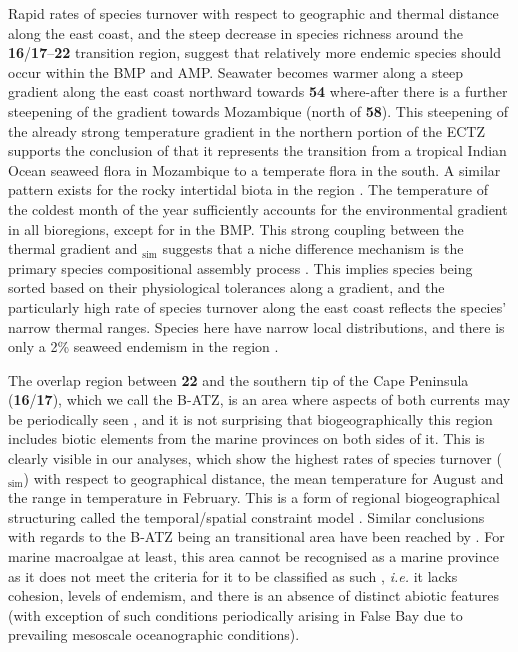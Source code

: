 \documentclass[utf8]{frontiersSCNS} %
\begin{document}
Rapid rates of species turnover with respect to geographic and thermal distance along the east coast, and the steep decrease in species richness around the \textbf{16}/\textbf{17}--\textbf{22} transition region, suggest that relatively more endemic species should occur within the BMP and AMP. Seawater becomes warmer along a steep gradient along the east coast northward towards \textbf{54} where-after there is a further steepening of the gradient towards Mozambique (north of \textbf{58}). This steepening of the already strong temperature gradient in the northern portion of the ECTZ supports the conclusion of \citep{Bolton2004} that it represents the transition from a tropical Indian Ocean seaweed flora in Mozambique to a temperate flora in the south. A similar pattern exists for the rocky intertidal biota in the region \citep{Sink2005}. The temperature of the coldest month of the year sufficiently accounts for the environmental gradient in all bioregions, except for in the BMP. This strong coupling between the thermal gradient and \textbeta$_{\text{sim}}$ suggests that a niche difference mechanism is the primary species compositional assembly process \citep{Nekola1999}. This implies species being sorted based on their physiological tolerances along a gradient, and the particularly high rate of species turnover along the east coast reflects the species' narrow thermal ranges. Species here have narrow local distributions, and there is only a 2\% seaweed endemism in the region \citep{Bolton2004}.

The overlap region between \textbf{22} and the southern tip of the Cape Peninsula (\textbf{16}/\textbf{17}), which we call the B-ATZ, is an area where aspects of both currents may be periodically seen \citep{Largier1992}, and it is not surprising that biogeographically this region includes biotic elements from the marine provinces on both sides of it. This is clearly visible in our analyses, which show the highest rates of species turnover (\textbeta$_{\text{sim}}$) with respect to geographical distance, the mean temperature for August and the range in temperature in February. This is a form of regional biogeographical structuring called the temporal/spatial constraint model \citep{Nekola1999}. Similar conclusions with regards to the B-ATZ being an transitional area have been reached by \citep{Stephenson1948,Bolton1986,Bolton2004,Mead2013}. For marine macroalgae at least, this area cannot be recognised as a marine province as it does not meet the criteria for it to be classified as such \citep{Spalding2007}, \emph{i.e.} it lacks cohesion, levels of endemism, and there is an absence of distinct abiotic features (with exception of such conditions periodically arising in False Bay due to prevailing mesoscale oceanographic conditions).
\end{document}
